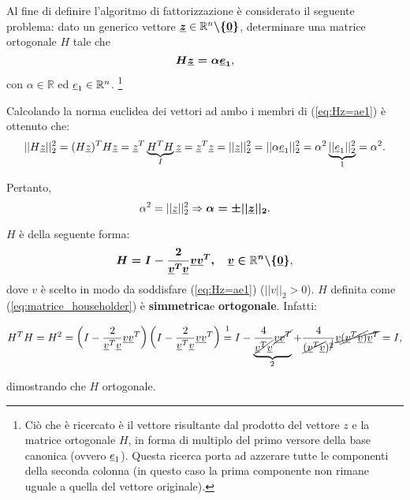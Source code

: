 Al fine di definire l'algoritmo di fattorizzazione è considerato il seguente problema: dato un generico vettore $\boldsymbol{\uline z}\in\mathbb R^n\boldsymbol{\backslash\{\uline 0\}}$, determinare una matrice ortogonale $H$ tale che
\begin{equation}\label{eq:Hz=ae1}
   \boldsymbol{H\uline z = \alpha\uline e_1},
\end{equation}
con $\alpha\in\mathbb R$ ed $\uline e_1\in\mathbb R^n$. \footnote{Ciò che è ricercato è il vettore risultante dal prodotto del vettore $z$ e la matrice ortogonale $H$, in forma di multiplo del primo versore della base canonica (ovvero $\uline e_1$). Questa ricerca porta ad azzerare tutte le componenti della seconda colonna (in questo caso la prima componente non rimane uguale a quella del vettore originale).}

Calcolando la norma euclidea dei vettori ad ambo i membri di (\ref{eq:Hz=ae1}) è ottenuto che:
\begin{equation*}
    ||H\uline z||_2^2 = (H\uline z)^TH\uline z=\uline z^T\underbrace{H^TH}_{I}\uline z = \uline z^T\uline z=||\uline z||_2^2 = ||\alpha \uline e_1||_2^2 = \alpha^2 \underbrace{||\uline e_1||_2^2}_{1} = \alpha^2.
\end{equation*}

Pertanto,
\begin{equation}\label{eq:aNormZ}
    \alpha^2=||\uline z||_2^2\Rightarrow\boldsymbol{\alpha = \pm ||\uline z||_2}.
\end{equation}

$H$ è della seguente forma:
\begin{equation}\label{eq:matrice_householder}
    \boldsymbol{H=I-\frac{2}{\uline v^T\uline v}\uline v\uline v^T,\quad \uline v\in\mathbb R^n\backslash\{\uline 0\}},
\end{equation}
dove $v$ è scelto in modo da soddisfare (\ref{eq:Hz=ae1}) ($||v||_2>0$). $H$ definita come (\ref{eq:matrice_householder}) è \textbf{simmetrica}\footnotemark e \textbf{ortogonale}\footnotemark. Infatti:
\addtocounter{footnote}{-1}

\begin{equation*}
    H^TH=H^2=\left(I-\frac{2}{\uline v^T\uline v}\uline v\uline v^T\right)\left(I-\frac{2}{\uline v^T\uline v}\uline v\uline v^T\right) \overset{\footnotemark}{=}I - \underbrace{\frac{4}{\cancel{\uline v^T\uline v}}\cancel{\uline v\uline v^T}}_{\footnotemark} + \frac{4}{\cancel{(\uline v^T\uline v})^{\cancel{2}}}\cancel{\uline v \cancel{(\uline v^T \uline v)}\uline v^T} = I,
\end{equation*}
dimostrando che $H$ ortogonale.
\addtocounter{footnote}{-1}

